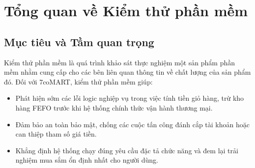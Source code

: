 \section{Tổng quan về Kiểm thử phần mềm}

\subsection{Mục tiêu và Tầm quan trọng}
Kiểm thử phần mềm là quá trình khảo sát thực nghiệm một sản phẩm phần mềm nhằm cung cấp cho các bên liên quan thông tin về chất lượng của sản phẩm đó. Đối với 7coMART, kiểm thử phần mềm giúp:
\begin{itemize}
    \item Phát hiện sớm các lỗi logic nghiệp vụ trong việc tính tiền giỏ hàng, trừ kho hàng FEFO trước khi hệ thống chính thức vận hành thương mại.
    \item Đảm bảo an toàn bảo mật, chống các cuộc tấn công đánh cắp tài khoản hoặc can thiệp tham số giá tiền.
    \item Khẳng định hệ thống chạy đúng yêu cầu đặc tả chức năng và đem lại trải nghiệm mua sắm ổn định nhất cho người dùng.
\end{itemize}


